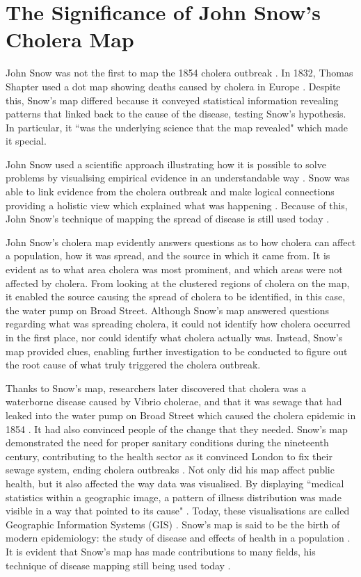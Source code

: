 \documentclass[12pt]{article}
\begin{document}
\section{The Significance of John Snow's Cholera Map}

John Snow was not the first to map the 1854 cholera outbreak \cite{history, johnson}. In 1832, Thomas Shapter used a dot map showing deaths caused by cholera in Europe \cite{howe1970some}. Despite this, Snow's map differed because it conveyed statistical information revealing patterns that linked back to the cause of the disease, testing Snow's hypothesis. In particular, it ``was the underlying science that the map revealed" \cite{johnson, history} which made it special.

John Snow used a scientific approach illustrating how it is possible to solve problems by visualising empirical evidence in an understandable way \cite{tedtalk}. Snow was able to link evidence from the cholera outbreak and make logical connections providing a holistic view which explained what was happening \cite{channel1,blog}. Because of this, John Snow's technique of mapping the spread of disease is still used today \cite{channel1}. 

John Snow's cholera map evidently answers questions as to how cholera can affect a population, how it was spread, and the source in which it came from. It is evident as to what area cholera was most prominent, and which areas were not affected by cholera. From looking at the clustered regions of cholera on the map, it enabled the source causing the spread of cholera to be identified, in this case, the water pump on Broad Street. Although Snow's map answered questions regarding what was spreading cholera, it could not identify how cholera occurred in the first place, nor could identify what cholera actually was. Instead, Snow's map provided clues, enabling further investigation to be conducted to figure out the root cause of what truly triggered the cholera outbreak.  

Thanks to Snow's map, researchers later discovered that cholera was a waterborne disease caused by Vibrio cholerae, and that it was sewage that had leaked into the water pump on Broad Street which caused the cholera epidemic in 1854 \cite{channel1}. It had also convinced people of the change that they needed. Snow's map demonstrated the need for proper sanitary conditions during the nineteenth century, contributing to the health sector as it convinced London to fix their sewage system, ending cholera outbreaks \cite{top5}. Not only did his map affect public health, but it also affected the way data was visualised. By displaying ``medical statistics within a geographic image, a pattern of illness distribution was made visible in a way that pointed to its cause" \cite{test}. Today, these visualisations are called Geographic Information Systems (GIS) \cite{test}. Snow's map is said to be the birth of modern epidemiology: the study of disease and effects of health in a population \cite{youtube}. It is evident that Snow's map has made contributions to many fields, his technique of disease mapping still being used today \cite{channel1}. 
\end{document}

